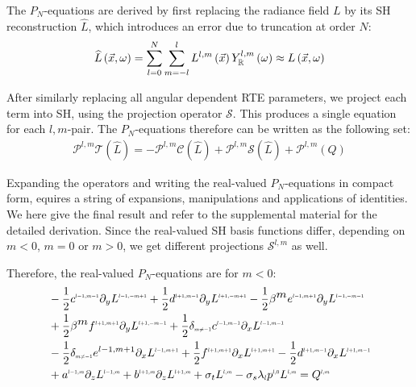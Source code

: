 The $P_N$-equations are derived by first replacing the radiance field $L$ by its SH reconstruction $\widehat{L}$, which introduces an error due to truncation at order $N$:
\begin{align*}
\widehat{L}\left(\vec{x}, \omega\right) =
\sum_{l=0}^{N}
{
\sum_{m=-l}^{l}
{
L^{l,m}\left(\vec{x}\right)Y_{\mathbb{R}}^{l,m}\left(\omega\right)
}
}
\approx
L\left(\vec{x}, \omega\right)
\end{align*}

After similarly replacing all angular dependent RTE parameters, we project each term into SH, using the projection operator $\mathcal{S}$. This produces a single equation for each $l,m$-pair. The $P_N$-equations therefore can be written as the following set:
\begin{align}
\mathcal{P}^{l,m}\mathcal{T}\left(\widehat{L}\right)
=
-\mathcal{P}^{l,m}\mathcal{C}\left(\widehat{L}\right) 
+\mathcal{P}^{l,m}\mathcal{S}\left(\widehat{L}\right)
+\mathcal{P}^{l,m}\left(Q\right)
\nonumber
\end{align}

Expanding the operators and writing the real-valued $P_N$-equations in compact form, equires a string of expansions, manipulations and applications of identities. We here give the final result and refer to the supplemental material for the detailed derivation. Since the real-valued SH basis functions differ, depending on $m<0$, $m=0$ or $m>0$, we get different projections $\mathcal{S}^{l,m}$ as well.

Therefore, the real-valued $P_N$-equations are for $m<0$:
\begin{align*}
&-\frac{1}{2}c^{\scaleto{l-1,m-1}{4pt}}
\partial_y
L^{\scaleto{l-1,-m+1}{4pt}}
+\frac{1}{2}d^{\scaleto{l+1,m-1}{4pt}}
\partial_y
L^{\scaleto{l+1,-m+1}{4pt}}
-\frac{1}{2}\beta^{\scaleto{m}{4pt}}e^{\scaleto{l-1,m+1}{4pt}}
\partial_y
L^{\scaleto{l-1,-m-1}{4pt}}
\\&
+\frac{1}{2}\beta^{\scaleto{m}{4pt}}f^{\scaleto{l+1,m+1}{4pt}}
\partial_y
L^{\scaleto{l+1,-m-1}{4pt}}
+\frac{1}{2}\delta_{\scaleto{m\neq -1}{4pt}}c^{\scaleto{l-1,m-1}{4pt}}
\partial_x
L^{\scaleto{l-1,m-1}{4pt}}
\\&
-\frac{1}{2}\delta_{\scaleto{m\neq -1}{4pt}}e^{{l-1,m+1}}
\partial_x
L^{\scaleto{l-1,m+1}{4pt}}
+\frac{1}{2}f^{\scaleto{l+1,m+1}{4pt}}
\partial_x
L^{\scaleto{l+1,m+1}{4pt}}
-\frac{1}{2}d^{\scaleto{l+1,m-1}{4pt}}
\partial_x
L^{\scaleto{l+1,m-1}{4pt}}
\\&
+a^{\scaleto{l-1,m}{4pt}}
\partial_z
L^{\scaleto{l-1,m}{4pt}}
+b^{\scaleto{l+1,m}{4pt}}
\partial_z
L^{\scaleto{l+1,m}{4pt}}
+\sigma_t L^{\scaleto{l,m}{4pt}}
-\sigma_s\lambda_{\scaleto{l}{4pt}}p^{\scaleto{l,0}{4pt}}L^{\scaleto{l,m}{4pt}}
= Q^{\scaleto{l,m}{4pt}}
\end{align*}

